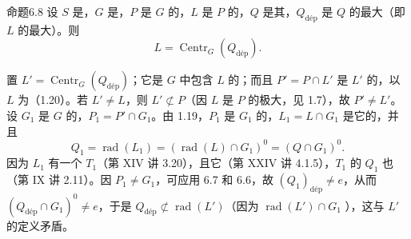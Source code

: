 \begin{SGAresult}{命题}{6.8}
设 $S$ 是，$G$ 是，$P$ 是 $G$ 的，$L$ 是 $P$ 的，$Q$ 是其，$Q_{\mathrm{d\text{é}p}}$ 是 $Q$ 的最大（即 $L$ 的最大）。则
\[
 L=\operatorname{Centr}_G(Q_{\mathrm{d\text{é}p}}).
\]
\end{SGAresult}
置 $L'=\operatorname{Centr}_G(Q_{\mathrm{d\text{é}p}})$；它是 $G$ 中包含 $L$ 的；而且 $P'=P\cap L'$ 是 $L'$ 的，以 $L$ 为（1.20）。若 $L'\neq L$，则 $L'\not\subset P$（因 $L$ 是 $P$ 的极大，见 1.7），故 $P'\neq L'$。
设 $G_1$ 是 $G$ 的，$P_1=P'\cap G_1$。由 1.19，$P_1$ 是 $G_1$ 的，$L_1=L\cap G_1$ 是它的，并且
\[
 Q_1=\operatorname{rad}(L_1)=(\operatorname{rad}(L)\cap G_1)^0=(Q\cap G_1)^0.
\]
因为 $L_1$ 有一个 $T_1$（第 XIV 讲 3.20），且它（第 XXIV 讲 4.1.5），$T_1$ 的 $Q_1$ 也（第 IX 讲 2.11）。因 $P_1\neq G_1$，可应用 6.7 和 6.6，故 $(Q_1)_{\mathrm{d\text{é}p}}\neq e$，从而 $(Q_{\mathrm{d\text{é}p}}\cap G_1)^0\neq e$，于是 $Q_{\mathrm{d\text{é}p}}\not\subset\operatorname{rad}(L')$（因为 $\operatorname{rad}(L')\cap G_1$ ），这与 $L'$ 的定义矛盾。

